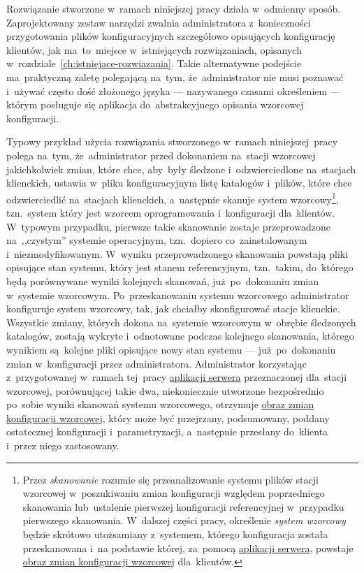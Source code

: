 \documentclass[thesis]{subfiles}
\begin{document}
Rozwiązanie stworzone w~ramach niniejszej pracy działa w~odmienny sposób. Zaprojektowany zestaw narzędzi zwalnia administratora z~konieczności przygotowania plików konfiguracyjnych szczegółowo opisujących konfigurację klientów, jak ma~to~miejsce w~istniejących rozwiązaniach, opisanych w~rozdziale~\ref{ch:istniejace-rozwiazania}. Takie alternatywne podejście ma~praktyczną zaletę polegającą na~tym, że~administrator nie musi poznawać i~używać często dość złożonego języka --- nazywanego czasami określeniem  --- którym posługuje się aplikacja do~abstrakcyjnego opisania wzorcowej konfiguracji.

Typowy przykład użycia rozwiązania stworzonego w~ramach niniejszej~pracy polega na~tym, że~administrator przed dokonaniem na~stacji wzorcowej jakichkolwiek zmian, które chce, aby~były śledzone i~odzwierciedlone na~stacjach klienckich, ustawia w~pliku konfiguracyjnym listę katalogów i~plików, które chce odzwierciedlić na~stacjach klienckich, a~następnie skanuje system wzorcowy\footnote{Przez \emph{skanowanie} rozumie się przeanalizowanie systemu plików stacji wzorcowej w~poszukiwaniu zmian konfiguracji względem poprzedniego skanowania lub~ustalenie pierwszej konfiguracji referencyjnej w~przypadku pierwszego skanowania. W~dalszej części pracy, określenie \emph{system wzorcowy} będzie skrótowo utożsamiany z~systemem, którego konfiguracja została przeskanowana i~na podstawie której, za~pomocą \hyperref[sec:srv-app]{aplikacji serwera}, powstaje \hyperref[sec:obraz-zmian-konfiguracji]{obraz zmian konfiguracji wzorcowej} dla~klientów.}, tzn.~system który jest wzorcem oprogramowania i~konfiguracji dla~klientów. W~typowym przypadku, pierwsze takie skanowanie zostaje przeprowadzone na~,,czystym'' systemie operacyjnym, tzn.~dopiero co~zainstalowanym i~niezmodyfikowanym. W~wyniku przeprowadzonego skanowania powstają pliki opisujące stan systemu, który jest stanem referencyjnym, tzn.~takim, do~którego będą porównywane wyniki kolejnych skanowań, już~po~dokonaniu zmian w~systemie wzorcowym. Po~przeskanowaniu systemu wzorcowego administrator konfiguruje system wzorcowy, tak, jak chciałby skonfigurować stacje klienckie. Wszystkie zmiany, których dokona na~systemie wzorcowym w~obrębie śledzonych katalogów, zostają wykryte i~odnotowane podczas kolejnego skanowania, którego wynikiem są~kolejne pliki opisujące nowy stan systemu --- już~po~dokonaniu zmian w~konfiguracji przez administratora. Administrator korzystając z~przygotowanej w~ramach tej~pracy \hyperref[sec:srv-app]{aplikacji serwera} przeznaczonej dla~stacji wzorcowej, porównującej takie dwa, niekoniecznie utworzone bezpośrednio po~sobie wyniki skanowań systemu wzorcowego, otrzymuje \hyperref[sec:obraz-zmian-konfiguracji]{obraz zmian konfiguracji wzorcowej}, który może być przejrzany, podsumowany, poddany ostatecznej konfiguracji i~parametryzacji, a~następnie przesłany do~klienta i~przez niego zastosowany.%
\end{document}
